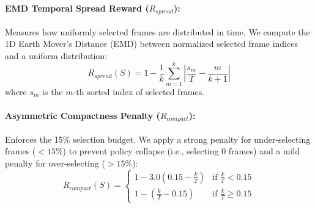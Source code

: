\documentclass[letterpaper]{article} %
\begin{document}
\paragraph{EMD Temporal Spread Reward ($R_{spread}$):} Measures how uniformly selected frames are distributed in time. We compute the 1D Earth Mover's Distance (EMD) between normalized selected frame indices and a uniform distribution:
\begin{equation}
    R_{spread}(S) = 1 - \frac{1}{k} \sum_{m=1}^k \left| \frac{s_m}{T} - \frac{m}{k+1} \right|
\end{equation}
where $s_m$ is the $m$-th sorted index of selected frames.

\paragraph{Asymmetric Compactness Penalty ($R_{compact}$):} Enforces the 15\% selection budget. We apply a strong penalty for under-selecting frames ($<15\%$) to prevent policy collapse (i.e., selecting 0 frames) and a mild penalty for over-selecting ($>15\%$):
\begin{equation}
    R_{compact}(S) = \begin{cases}
      1 - 3.0(0.15 - \frac{k}{T}) & \text{if } \frac{k}{T} < 0.15 \\
      1 - (\frac{k}{T} - 0.15) & \text{if } \frac{k}{T} \ge 0.15
    \end{cases}
\end{equation}
\end{document}
